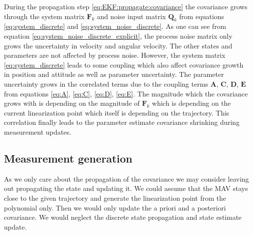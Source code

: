 \documentclass[10pt,a4paper]{article}
\renewcommand{\d}[1]{\ensuremath{\operatorname{d}\!{#1}}}
\begin{document}
During the propagation step \ref{eq:EKF:propagate:covariance} the covariance grows through the system matrix $\mathbf{F}_k$ and noise input matrix $\mathbf{Q}_k$ from equations \ref{eq:system_discrete} and \ref{eq:system_noise_discrete}. As one can see from equation \ref{eq:system_noise_discrete_explicit}, the process noise matrix only grows the uncertainty in velocity and angular velocity. The other states and parameters are not affected by process noise. However, the system matrix \ref{eq:system_discrete} leads to some coupling which also affect covariance growth in position and attitude as well as parameter uncertainty. The parameter uncertainty grows in the correlated terms due to the coupling terms $\mathbf{A}$, $\mathbf{C}$, $\mathbf{D}$, $\mathbf{E}$ from equations \ref{eq:A}, \ref{eq:C}, \ref{eq:D}, \ref{eq:E}. The magnitude which the covariance grows with is depending on the magnitude of $\mathbf{F}_k$ which is depending on the current linearization point which itself is depending on the trajectory. This correlation finally leads to the parameter estimate covariance shrinking during measurement updates.

\subsection*{Measurement generation}
As we only care about the propagation of the covariance we may consider leaving out propagating the state and updating it. We could assume that the MAV stays close to the given trajectory and generate the linearization point from the polynomial only. Then we would only update the a priori and a posteriori covariance. We would neglect the discrete state propagation and state estimate update.

\printbibliography
\end{document}
